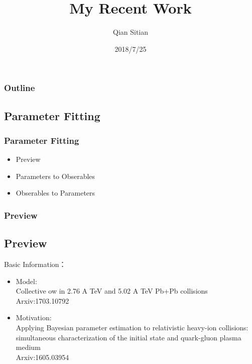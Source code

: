 \documentclass{beamer}
\title{My Recent Work}
\author{Qian Sitian}
\date{2018/7/25}
\begin{document}
\begin{frame}
    \titlepage
\end{frame}
\begin{frame}
    \frametitle{Outline}
    \tableofcontents
\end{frame}
\begin{frame}   
    \section{Parameter Fitting}
    \frametitle{Parameter Fitting}
    \begin{itemize}
        \item Preview
        \item Parameters to Obserables
        \item Obserables to Parameters
    \end{itemize}
\end{frame}
\begin{frame}
    \frametitle{Preview}
    \subsection{Preview}
    Basic Information：
    \begin{itemize}
        \item Model:\\Collective 
        ow in 2.76 A TeV and 5.02 A TeV Pb+Pb
        collisions
        \\
        Arxiv:1703.10792
        \item Motivation:\\Applying Bayesian parameter estimation to relativistic heavy-ion collisions:
        simultaneous characterization of the initial state and quark-gluon plasma medium
        \\
        Arxiv:1605.03954
    \end{itemize}
\end{frame}
\end{document}
